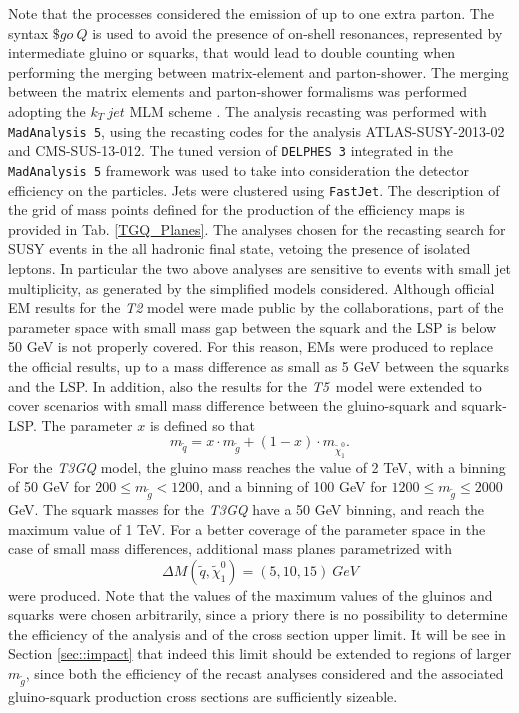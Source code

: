 \documentclass[a4paper,11pt]{article}
\newcommand{\MGLU}{$ m _{ \tilde g } $\xspace}
\newcommand{\Tfive}{ \textit{T5}}
\begin{document}
Note that the processes considered the emission of up to one extra parton. The syntax $\$go \ Q$ is used to avoid the presence of on-shell resonances, represented by intermediate gluino or squarks, that would lead to double counting when performing the merging between matrix-element and parton-shower. The merging between the matrix elements and parton-shower formalisms was performed adopting the $k_T \ jet$ MLM scheme \cite{MLM,Alwall:2007fs}. 
%
The analysis recasting was performed with \texttt{MadAnalysis 5}, using the recasting codes for the analysis ATLAS-SUSY-2013-02\cite{ATLAS-SUSY-2013-02MA5,ATLAS-SUSY-2013-02VALIDATION} and CMS-SUS-13-012\cite{CMS-SUS-13-012MA5,CMS-SUS-13-012VALIDATION}. The tuned version of \texttt{DELPHES 3} integrated in the \texttt{MadAnalysis 5} framework was used to take into consideration the detector efficiency on the particles. Jets were clustered using \texttt{FastJet}\cite{Cacciari:2011ma}.
%
The description of the grid of mass points defined for the production of the efficiency maps is provided in Tab. \ref{TGQ_Planes}. The analyses chosen for the recasting search for SUSY events in the all hadronic final state, vetoing the presence of isolated leptons. In particular the two above analyses are sensitive to events with small jet multiplicity, as generated by the simplified models considered. Although official EM results for the \textit{T2} model were made public by the collaborations, part of the parameter space with small mass gap between the squark and the LSP is below $~$50 GeV is not properly covered. For this reason, EMs were produced to replace the official results, up to a mass difference as small as 5 GeV between the squarks and the LSP. In addition, also the results for the \Tfive~model were extended to cover scenarios with small mass difference between the gluino-squark and squark-LSP. The parameter $x$ is defined so that
\begin{equation}
m_{\tilde q}= x\cdot m_{\tilde g} + (1-x)\cdot m_{\tilde \chi_1 ^0}.
\end{equation}
%
For the \textit{T3GQ} model, the gluino mass reaches the value of 2 TeV, with a binning of 50 GeV for $200 \leq m_{\tilde g} < 1200$, and a binning of 100 GeV for $1200 \leq m_{\tilde g}  \leq 2000$ GeV. The squark masses for the \textit{T3GQ} have a 50 GeV binning, and reach the maximum value of 1 TeV. For a better coverage of the parameter space in the case of small mass differences, additional mass planes parametrized with 
\begin{equation}
\Delta M ( \tilde q, \tilde \chi _1 ^0)=(5,10,15) \ GeV
\end{equation}
were produced. Note that the values of the maximum values of the gluinos and squarks were chosen arbitrarily, since a priory there is no possibility to determine the efficiency of the analysis and of the cross section upper limit. It will be see in Section \ref{sec::impact} that indeed this limit should be extended to regions of larger \MGLU, since both the efficiency of the recast analyses considered and the associated gluino-squark production cross sections are sufficiently sizeable.
%
\end{document}

